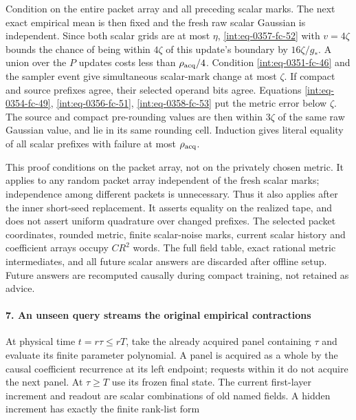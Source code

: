 Condition on the entire packet array and all preceding scalar marks. The next exact empirical mean is then fixed and the fresh raw scalar Gaussian is independent. Since both scalar grids are at most \(\eta\), \eqref{int:eq-0357-fc-52} with \(v=4\zeta\) bounds the chance of being within \(4\zeta\) of this update's boundary by \(16\zeta/g_\ast\). A union over the \(P\) updates costs less than \(\rho_{\rm acq}/4\). Condition \eqref{int:eq-0351-fc-46} and the sampler event give simultaneous scalar-mark change at most \(\zeta\). If compact and source prefixes agree, their selected operand bits agree. Equations \eqref{int:eq-0354-fc-49}, \eqref{int:eq-0356-fc-51}, \eqref{int:eq-0358-fc-53} put the metric error below \(\zeta\). The source and compact pre-rounding values are then within \(3\zeta\) of the same raw Gaussian value, and lie in its same rounding cell. Induction gives literal equality of all scalar prefixes with failure at most \(\rho_{\rm acq}\).



This proof conditions on the packet array, not on the privately chosen metric. It applies to any random packet array independent of the fresh scalar marks; independence among different packets is unnecessary. Thus it also applies after the inner short-seed replacement. It asserts equality on the realized tape, and does not assert uniform quadrature over changed prefixes. The selected packet coordinates, rounded metric, finite scalar-noise marks, current scalar history and coefficient arrays occupy \(CR^2\) words. The full field table, exact rational metric intermediates, and all future scalar answers are discarded after offline setup. Future answers are recomputed causally during compact training, not retained as advice.


\paragraph{7. An unseen query streams the original empirical contractions}
\label{int:decoder-passive-query}

\mbox{}\par\smallskip


At physical time \(t=r\tau\le rT\), take the already acquired panel containing \(\tau\) and evaluate its finite parameter polynomial. A panel is acquired as a whole by the causal coefficient recurrence at its left endpoint; requests within it do not acquire the next panel. At \(\tau\ge T\) use its frozen final state. The current first-layer increment and readout are scalar combinations of old named fields. A hidden increment has exactly the finite rank-list form


